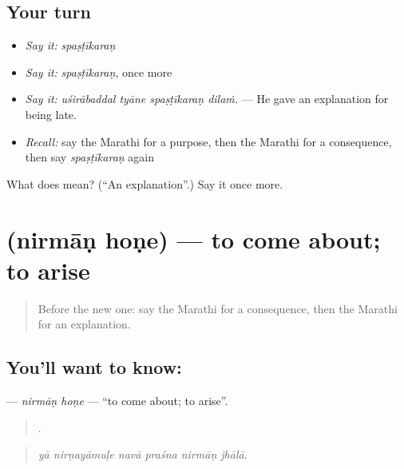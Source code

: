 \subsection*{Your turn}
\begin{itemize}
\raggedright
  \item \emph{Say it:} \emph{spaṣṭīkaraṇ}
  \item \emph{Say it:} \emph{spaṣṭīkaraṇ}, once more
  \item \emph{Say it:} \emph{uśirābaddal tyāne spaṣṭīkaraṇ dilaṁ.} — He gave an explanation for being late.
  \item \emph{Recall:} say the Marathi for a purpose, then the Marathi for a consequence, then say \emph{spaṣṭīkaraṇ} again
\end{itemize}

\begin{tcolorbox}[breakable,colback=teal!4,colframe=teal!35!black,title={Before you move on}]
What does  mean? (\textquotedblleft{}An explanation\textquotedblright{}.) Say it once more.
\end{tcolorbox}
\section[\texorpdfstring{\mr{निर्माण} \mr{होणे} (nirmāṇ hoṇe)}{निर्माण होणे (nirmāṇ hoṇe)}]{  (nirmāṇ hoṇe) — to come about; to arise}

\label{lesson:MR-C342-nirman-hone}



\begin{quote}
Before the new one: say the Marathi for a consequence, then the Marathi for an explanation.
\end{quote}

\subsection*{You'll want to know:  }
\textbf{ } — \emph{nirmāṇ hoṇe} — \textquotedblleft{}to come about; to arise\textquotedblright{}.

\begin{quote}
     .
\end{quote}

\begin{quote}
\emph{yā nirṇayāmuḷe navā praśna nirmāṇ jhālā.}
\end{quote}


